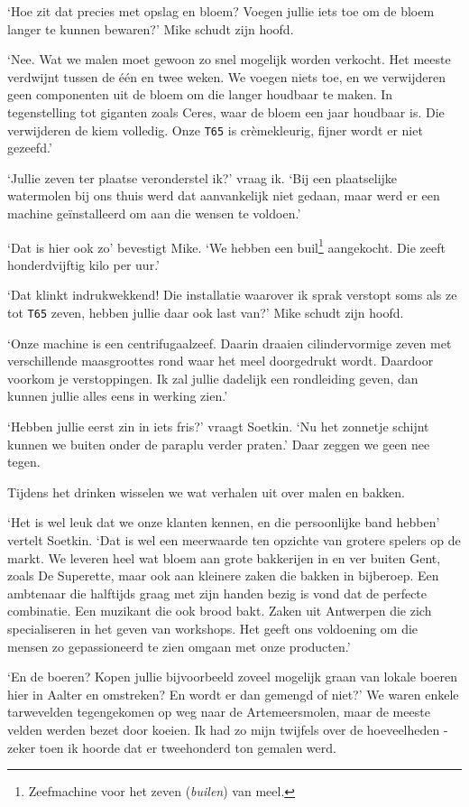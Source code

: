 \documentclass[
  11pt,
  dutch,
]{memoir}
\begin{document}
`Hoe zit dat precies met opslag en bloem? Voegen jullie iets toe om de
bloem langer te kunnen bewaren?' Mike schudt zijn hoofd.

`Nee. Wat we malen moet gewoon zo snel mogelijk worden verkocht. Het
meeste verdwijnt tussen de één en twee weken. We voegen niets toe, en we
verwijderen geen componenten uit de bloem om die langer houdbaar te
maken. In tegenstelling tot giganten zoals Ceres, waar de bloem een jaar
houdbaar is. Die verwijderen de kiem volledig. Onze \texttt{T65} is
crèmekleurig, fijner wordt er niet gezeefd.'

`Jullie zeven ter plaatse veronderstel ik?' vraag ik. `Bij een
plaatselijke watermolen bij ons thuis werd dat aanvankelijk niet gedaan,
maar werd er een machine geïnstalleerd om aan die wensen te voldoen.'

`Dat is hier ook zo' bevestigt Mike. `We hebben een buil\footnote{Zeefmachine
  voor het zeven (\emph{builen}) van meel.} aangekocht. Die zeeft
honderdvijftig kilo per uur.'

`Dat klinkt indrukwekkend! Die installatie waarover ik sprak verstopt
soms als ze tot \texttt{T65} zeven, hebben jullie daar ook last van?'
Mike schudt zijn hoofd.

`Onze machine is een centrifugaalzeef. Daarin draaien cilindervormige
zeven met verschillende maasgroottes rond waar het meel doorgedrukt
wordt. Daardoor voorkom je verstoppingen. Ik zal jullie dadelijk een
rondleiding geven, dan kunnen jullie alles eens in werking zien.'

`Hebben jullie eerst zin in iets fris?' vraagt Soetkin. `Nu het zonnetje
schijnt kunnen we buiten onder de paraplu verder praten.' Daar zeggen we
geen nee tegen.

Tijdens het drinken wisselen we wat verhalen uit over malen en bakken.

`Het is wel leuk dat we onze klanten kennen, en die persoonlijke band
hebben' vertelt Soetkin. `Dat is wel een meerwaarde ten opzichte van
grotere spelers op de markt. We leveren heel wat bloem aan grote
bakkerijen in en ver buiten Gent, zoals De Superette, maar ook aan
kleinere zaken die bakken in bijberoep. Een ambtenaar die halftijds
graag met zijn handen bezig is vond dat de perfecte combinatie. Een
muzikant die ook brood bakt. Zaken uit Antwerpen die zich specialiseren
in het geven van workshops. Het geeft ons voldoening om die mensen zo
gepassioneerd te zien omgaan met onze producten.'

`En de boeren? Kopen jullie bijvoorbeeld zoveel mogelijk graan van
lokale boeren hier in Aalter en omstreken? En wordt er dan gemengd of
niet?' We waren enkele tarwevelden tegengekomen op weg naar de
Artemeersmolen, maar de meeste velden werden bezet door koeien. Ik had
zo mijn twijfels over de hoeveelheden - zeker toen ik hoorde dat er
tweehonderd ton gemalen werd.
\end{document}
